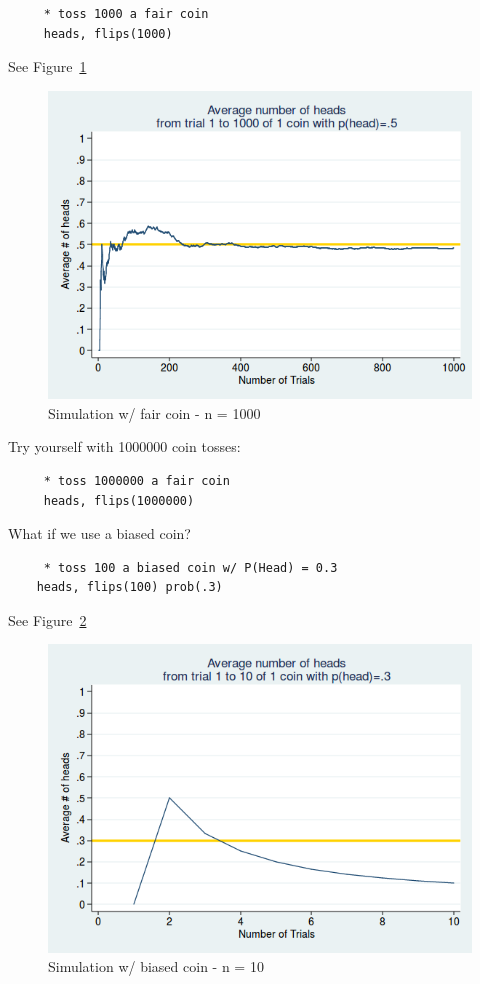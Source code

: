 \documentclass[11pt]{article}
\begin{document}
	\begin{verbatim}
	 * toss 1000 a fair coin
	 heads, flips(1000)
	\end{verbatim}

See Figure~\ref{f3}\\

\begin{figure}[htp]
\centering
\includegraphics[scale=0.50]{coin_sim_1000_fair.png}
\caption{Simulation w/ fair coin - n = 1000}
\label{f3}
\end{figure}
	
	 
Try yourself with 1000000 coin tosses:
	 
	\begin{verbatim}
	 * toss 1000000 a fair coin
	 heads, flips(1000000)
	\end{verbatim}
	
	What if we use a biased coin?

	\begin{verbatim}
	 * toss 100 a biased coin w/ P(Head) = 0.3
	heads, flips(100) prob(.3)	 
	\end{verbatim}

See Figure~\ref{f4}\\

\begin{figure}[htp]
\centering
\includegraphics[scale=0.50]{coin_sim_10_biased.png}
\caption{Simulation w/ biased coin - n = 10}
\label{f4}
\end{figure}
	
\end{document}
